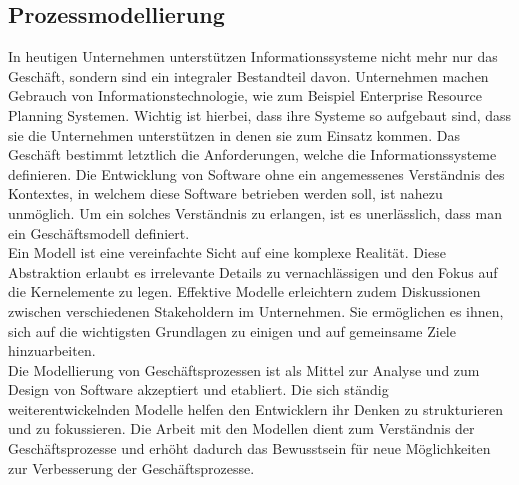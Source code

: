 \documentclass[a4paper, 12pt, twoside, headsepline=true]{scrartcl} %
\begin{document}
\subsection{Prozessmodellierung}\label{modellierung}
In heutigen Unternehmen unterstützen Informationssysteme nicht mehr nur das Geschäft, sondern sind ein integraler Bestandteil davon. Unternehmen machen Gebrauch von Informationstechnologie, wie zum Beispiel Enterprise Resource Planning Systemen. Wichtig ist hierbei, dass ihre Systeme so aufgebaut sind, dass sie die Unternehmen unterstützen in denen sie zum Einsatz kommen. Das Geschäft bestimmt letztlich die Anforderungen, welche die Informationssysteme definieren. Die Entwicklung von Software ohne ein angemessenes Verständnis des Kontextes, in welchem diese Software betrieben werden soll, ist nahezu unmöglich. Um ein solches Verständnis zu erlangen, ist es unerlässlich, dass man ein Geschäftsmodell definiert.\\
 Ein Modell ist eine vereinfachte Sicht auf eine komplexe Realität. Diese Abstraktion erlaubt es irrelevante Details zu vernachlässigen und den Fokus auf die Kernelemente zu legen. Effektive Modelle erleichtern zudem
Diskussionen zwischen verschiedenen Stakeholdern im Unternehmen. Sie ermöglichen es ihnen, sich auf die wichtigsten Grundlagen zu einigen und auf gemeinsame Ziele hinzuarbeiten.\\
Die Modellierung von Geschäftsprozessen ist als Mittel zur Analyse und zum Design von Software akzeptiert und etabliert. Die sich ständig weiterentwickelnden Modelle helfen den Entwicklern ihr Denken zu strukturieren und zu fokussieren. Die Arbeit mit den Modellen dient zum Verständnis der Geschäftsprozesse und erhöht dadurch das Bewusstsein für neue Möglichkeiten zur Verbesserung der Geschäftsprozesse.
\end{document}
